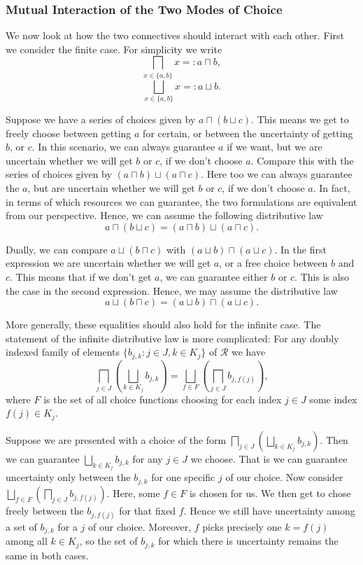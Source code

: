 \documentclass[12pt]{article}
\theoremstyle{definition}
\theoremstyle{plain}
\theoremstyle{plain}
\theoremstyle{plain}
\theoremstyle{plain}
\theoremstyle{remark}
\theoremstyle{remark}
\newcommand{\mc}[1]{\mathcal{#1}}
\begin{document}
\subsubsection{Mutual Interaction of the Two Modes of Choice}\label{sec:intr self}
We now look at how the two connectives should interact with each other. First we consider the finite case. For simplicity we write 
$$\bigsqcap_{x \in \{a,b\}} x =: a  \sqcap b,$$
$$\bigsqcup_{x \in \{a,b\}} x =: a  \sqcup b.$$

Suppose we have a series of choices given by $a \sqcap (b \sqcup c)$. This means we get to freely choose between getting $a$ for certain, or between the uncertainty of getting $b$, or $c$. In this scenario, we can always guarantee $a$ if we want, but we are uncertain whether we will get $b$ or $c$, if we don't choose $a$. Compare this with the series of choices given by $(a \sqcap b) \sqcup (a \sqcap c)$. Here too we can always guarantee the $a$, but are uncertain whether we will get $b$ or $c$, if we don't choose $a$. In fact, in terms of which resources we can guarantee, the two formulations are equivalent from our perspective. Hence, we can assume the following distributive law $$a \sqcap (b \sqcup c) = (a \sqcap b) \sqcup (a \sqcap c).$$

Dually, we can compare $a \sqcup (b \sqcap c)$ with $(a \sqcup b) \sqcap (a \sqcup c)$. In the first expression we are uncertain whether we will get $a$, or a free choice between $b$ and $c$. This means that if we don't get $a$, we can guarantee either $b$ or $c$. This is also the case in the second expression. Hence, we may assume the distributive law $$a \sqcup (b \sqcap c) = (a \sqcup b) \sqcap (a \sqcup c).$$

More generally, these equalities should also hold for the infinite case. The statement of the infinite distributive law is more complicated: For any doubly indexed family of elements $\{b_{j,k} : j \in J, k \in K_j\}$ of $\mc{R}$ we have
\begin{equation}\label{eq:meet dist}
	\bigsqcap_{j \in J} \left( \bigsqcup_{k \in K_j} b_{j,k} \right) = \bigsqcup_{f \in F} \left( \bigsqcap_{j \in J} b_{j,f(j)} \right),
\end{equation}
where $F$ is the set of all choice functions choosing for each index $j \in J$ some index $f(j) \in K_j$.

Suppose we are presented with a choice of the form $\bigsqcap_{j \in J} \left( \bigsqcup_{k \in K_j} b_{j,k} \right)$. Then we can guarantee $\bigsqcup_{k \in K_j} b_{j,k} $ for any $j \in J$ we choose. That is we can guarantee uncertainty only between the $b_{j,k}$ for one specific $j$ of our choice. Now consider $\bigsqcup_{f \in F} \left( \bigsqcap_{j \in J} b_{j,f(j)} \right)$. Here, some $f \in F$ is chosen for us. We then get to chose freely between the $b_{j,f(j)}$ for that fixed $f$. Hence we still have uncertainty among a set of $b_{j,k}$ for a $j$ of our choice. Moreover, $f$ picks precisely one $k = f(j)$ among all $k \in K_j$, so the set of $b_{j,k}$ for which there is uncertainty remains the same in both cases.
\end{document}
